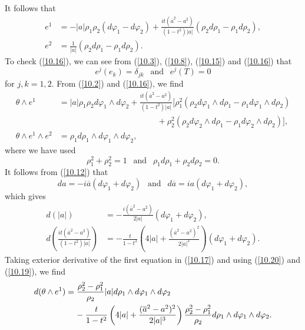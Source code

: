 \documentclass{amsart}
\theoremstyle{Corollary}
\numberwithin{equation}{section}
\begin{document}
It follows that 
\begin{equation}\label{10.16}
\begin{split}
e^1&=-|a|\rho_1\rho_2(d\varphi_1-d\varphi_2)+\frac{it(\overline{a}^2-a^2)}{(1-t^2)|a|}(\rho_2d\rho_1-\rho_1d\rho_2),\\
e^2&=\frac{1}{|a|}(\rho_2d\rho_1-\rho_1d\rho_2).
\end{split}
\end{equation}
To check (\ref{10.16}), we can see from (\ref{10.3}), (\ref{10.8}), (\ref{10.15}) and  (\ref{10.16}) that 
$$e^j(e_k)=\delta_{jk}~~\mbox{ and }~~e^j(T)=0$$
for $j,k=1,2$. 
From (\ref{10.2}) and (\ref{10.16}), we find 
\begin{equation}\label{10.17}
\begin{split}
\theta\wedge e^1
&=|a|\rho_1\rho_2d\varphi_1\wedge d\varphi_2
+\frac{it(\overline{a}^2-a^2)}{(1-t^2)|a|}\Big[\rho_1^2(\rho_2d\varphi_1\wedge d\rho_1-\rho_1 d\varphi_1\wedge d\rho_2)\\
&\hspace{5cm}
+\rho_2^2(\rho_2 d\varphi_2\wedge d\rho_1-\rho_1d\varphi_2\wedge d\rho_2)\Big],\\
\theta\wedge e^1\wedge e^2
&=\rho_1 d\rho_1\wedge d\varphi_1\wedge d\varphi_2, 
\end{split}
\end{equation}
where we have used   
\begin{equation}\label{10.20}
\rho_1^2+\rho_2^2=1~~\mbox{ and }~~\rho_1d\rho_1+\rho_2 d\rho_2=0. 
\end{equation}
It follows from 
(\ref{10.12}) that 
\begin{equation*}
da=-i\overline{a}(d\varphi_1+d\varphi_2)~~\mbox{ and }~~
d\overline{a}=ia(d\varphi_1+d\varphi_2),
\end{equation*}
which gives 
\begin{equation}\label{10.19}
\begin{split}
d(|a|)&=-\frac{i(\overline{a}^2-a^2)}{2|a|}(d\varphi_1+d\varphi_2),\\
d\left(\frac{it(\overline{a}^2-a^2)}{(1-t^2)|a|}\right)
&=-\frac{t}{1-t^2}\left(4|a|+\frac{(\overline{a}^2-a^2)^2}{2|a|^3}\right)(d\varphi_1+d\varphi_2). 
\end{split}
\end{equation}
Taking exterior derivative of the first equation in (\ref{10.17})
and
using  (\ref{10.20}) and (\ref{10.19}), we find 
\begin{equation}\label{10.18}
\begin{split}
d(\theta\wedge e^1)
&=\frac{\rho_2^2-\rho_1^2}{\rho_2}|a|d\rho_1\wedge d\varphi_1\wedge d\varphi_2\\
&\hspace{4mm}
-\frac{t}{1-t^2}\left(4|a|+\frac{(\overline{a}^2-a^2)^2}{2|a|^3}\right)\frac{\rho_2^2-\rho_1^2}{\rho_2}d\rho_1\wedge d\varphi_1\wedge d\varphi_2.
\end{split}
\end{equation}
\end{document}
